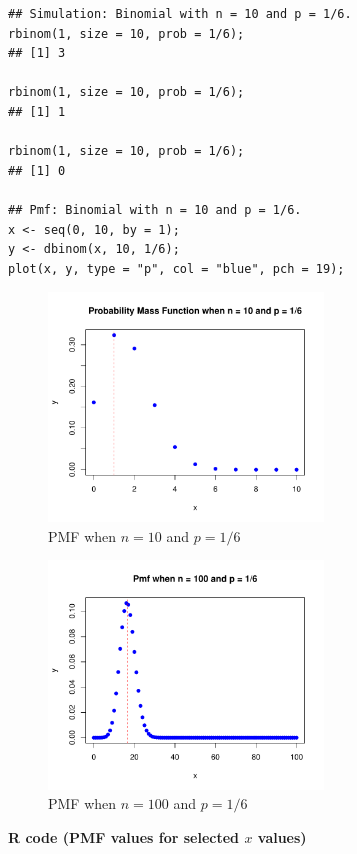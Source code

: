 \begin{tcolorbox}[colback=gray!10, colframe=black!45, arc=2mm]
\begin{verbatim}
## Simulation: Binomial with n = 10 and p = 1/6.
rbinom(1, size = 10, prob = 1/6);
## [1] 3

rbinom(1, size = 10, prob = 1/6);
## [1] 1

rbinom(1, size = 10, prob = 1/6);
## [1] 0

## Pmf: Binomial with n = 10 and p = 1/6.
x <- seq(0, 10, by = 1);
y <- dbinom(x, 10, 1/6);
plot(x, y, type = "p", col = "blue", pch = 19);
\end{verbatim}
\end{tcolorbox}
\vspace{1em}

\begin{figure}[H]
  \centering
  \includegraphics[width=0.65\textwidth]{section11/images/binomial_pmf.pdf}
  \caption{PMF when $n=10$ and $p=1/6$}
\end{figure}

\vspace{1em}

\begin{figure}[H]
  \centering
  \includegraphics[width=0.65\textwidth]{section11/images/binomial_pmf_100.pdf}
  \caption{PMF when $n=100$ and $p=1/6$}
\end{figure}
\vspace{1em}
\noindent\textbf{R code (PMF values for selected $x$ values)}

